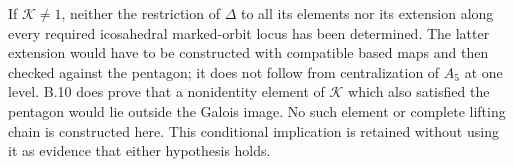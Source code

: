 If $\mathcal K\ne1$, neither the restriction of $\Delta$
to all its elements nor its extension along every required
icosahedral marked-orbit locus has been determined.
The latter extension would have to be constructed with
compatible based maps and then checked against the pentagon;
it does not follow from centralization of $A_5$ at one level.
B.10 does prove that a nonidentity element of $\mathcal K$
which also satisfied the pentagon would lie outside the
Galois image. No such element or complete lifting chain is
constructed here. This conditional implication is retained
without using it as evidence that either hypothesis holds.
